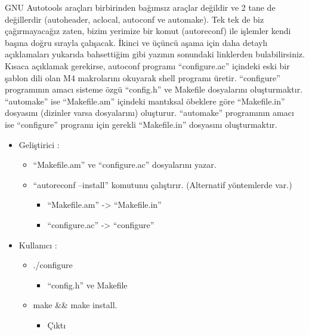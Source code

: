 \documentclass[
]{book}
\providecommand{\tightlist}{%
  \setlength{\itemsep}{0pt}\setlength{\parskip}{0pt}}
\begin{document}
GNU Autotools araçları birbirinden bağımsız araçlar değildir ve 2 tane de değillerdir (autoheader, aclocal, autoconf ve automake). Tek tek de biz çağırmayacağız zaten, bizim yerimize bir komut (autoreconf) ile işlemler kendi başına doğru sırayla çalışacak. İkinci ve üçüncü aşama için daha detaylı açıklamaları yukarıda bahsettiğim gibi yazının sonundaki linklerden bulabilirsiniz. Kısaca açıklamak gerekirse, autoconf programı ``configure.ac'' içindeki eski bir şablon dili olan M4 makrolarını okuyarak shell programı üretir. ``configure'' programının amacı sisteme özgü ``config.h'' ve Makefile dosyalarını oluşturmaktır. ``automake'' ise ``Makefile.am'' içindeki mantıksal öbeklere göre ``Makefile.in'' dosyasını (dizinler varsa dosyalarını) oluşturur. ``automake'' programının amacı ise ``configure'' programı için gerekli ``Makefile.in'' dosyasını oluşturmaktır.

\begin{itemize}
\tightlist
\item
  Geliştirici :

  \begin{itemize}
  \tightlist
  \item
    ``Makefile.am'' ve ``configure.ac'' dosyalarını yazar.
  \item
    ``autoreconf --install'' komutunu çalıştırır. (Alternatif yöntemlerde var.)

    \begin{itemize}
    \tightlist
    \item
      ``Makefile.am'' -\textgreater{} ``Makefile.in''
    \item
      ``configure.ac'' -\textgreater{} ``configure''
    \end{itemize}
  \end{itemize}
\item
  Kullanıcı :

  \begin{itemize}
  \tightlist
  \item
    ./configure

    \begin{itemize}
    \tightlist
    \item
      ``config.h'' ve Makefile
    \end{itemize}
  \item
    make \&\& make install.

    \begin{itemize}
    \tightlist
    \item
      Çıktı
    \end{itemize}
  \end{itemize}
\end{itemize}
\end{document}
